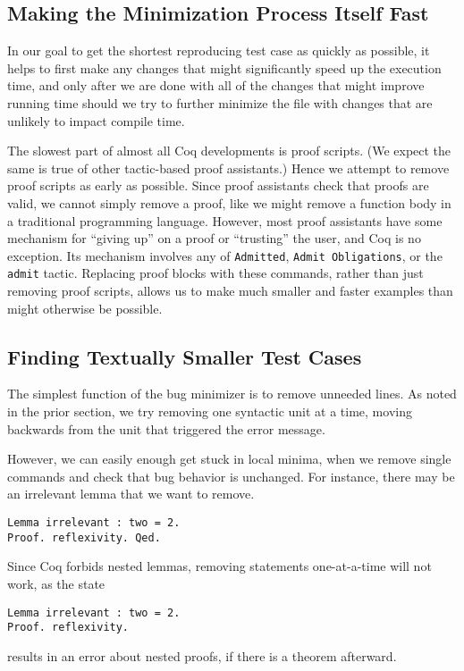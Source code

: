 \documentclass[a4paper,USenglish,cleveref,autoref,thm-restate,pdfa]{lipics-v2021}
\begin{document}
\subsection{Making the Minimization Process Itself Fast}

In our goal to get the shortest reproducing test case as quickly as possible, it helps to first make any changes that might significantly speed up the execution time, and only after we are done with all of the changes that might improve running time should we try to further minimize the file with changes that are unlikely to impact compile time.

The slowest part of almost all Coq developments is proof scripts.
(We expect the same is true of other tactic-based proof assistants.)
Hence we attempt to remove proof scripts as early as possible.
Since proof assistants check that proofs are valid, we cannot simply remove a proof, like we might remove a function body in a traditional programming language.
However, most proof assistants have some mechanism for ``giving up'' on a proof or ``trusting'' the user, and Coq is no exception.
Its mechanism involves any of \verb|Admitted|, \verb|Admit Obligations|, or the \verb|admit| tactic.
Replacing proof blocks with these commands, rather than just removing proof scripts, allows us to make much smaller and faster examples than might otherwise be possible.

\subsection{Finding Textually Smaller Test Cases}

The simplest function of the bug minimizer is to remove unneeded lines.
As noted in the prior section, we try removing one syntactic unit at a time, moving backwards from the unit that triggered the error message.

However, we can easily enough get stuck in local minima, when we remove single commands and check that bug behavior is unchanged.
For instance, there may be an irrelevant lemma that we want to remove.
\begin{verbatim}
Lemma irrelevant : two = 2.
Proof. reflexivity. Qed.
\end{verbatim}
Since Coq forbids nested lemmas, removing statements one-at-a-time will not work, as the state
\begin{verbatim}
Lemma irrelevant : two = 2.
Proof. reflexivity.
\end{verbatim}
results in an error about nested proofs, if there is a theorem afterward.
\end{document}

